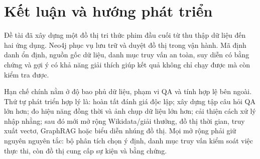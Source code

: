 \chapter{Kết luận và hướng phát triển}

Đề tài đã xây dựng một đồ thị tri thức phim đầu cuối từ thu thập dữ liệu đến hai
ứng dụng. Neo4j phục vụ lưu trữ và duyệt đồ thị trong vận hành. Mã định danh ổn
định, nguồn gốc dữ liệu, danh mục truy
vấn an toàn, suy diễn có bằng chứng và gợi ý có khả năng giải thích giúp kết quả
không chỉ chạy được mà còn kiểm tra được.

Hạn chế chính nằm ở độ bao phủ dữ liệu, phạm vi QA và tính hợp lệ bên ngoài. Thứ
tự phát triển hợp lý là: hoàn tất đánh giá độc lập; xây dựng tập câu hỏi QA lớn
hơn; đo hiệu năng đồng thời và ảnh chụp dữ liệu lớn hơn; cải thiện cách xử lý
nhập nhằng; sau đó mới mở rộng Wikidata/giải thưởng, đồ thị thời gian, truy xuất
vectơ, GraphRAG hoặc biểu diễn nhúng đồ thị. Mọi mở rộng phải giữ nguyên nguyên
tắc: bộ phân tích chọn ý định, danh mục truy vấn kiểm soát việc thực thi, còn đồ
thị cung cấp sự kiện và bằng chứng.
